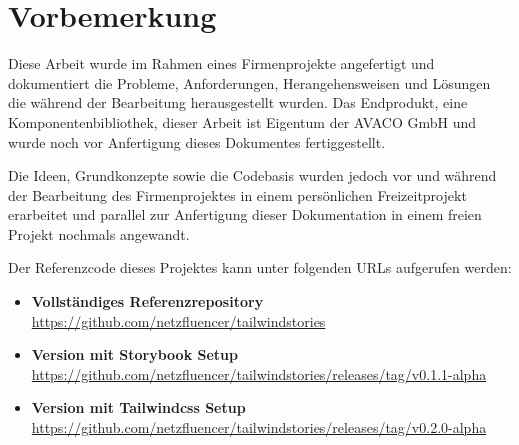 \chapter*{Vorbemerkung}
\label{sec:vorbemerkung}

Diese Arbeit wurde im Rahmen eines Firmenprojekte angefertigt und dokumentiert die Probleme, Anforderungen, Herangehensweisen und Lösungen die während der Bearbeitung herausgestellt wurden. Das Endprodukt, eine Komponentenbibliothek, dieser Arbeit ist Eigentum der AVACO GmbH und wurde noch vor Anfertigung dieses Dokumentes fertiggestellt.

Die Ideen, Grundkonzepte sowie die Codebasis wurden jedoch vor und während der Bearbeitung des Firmenprojektes in einem persönlichen Freizeitprojekt erarbeitet und parallel zur Anfertigung dieser Dokumentation in einem freien Projekt nochmals angewandt.

Der Referenzcode dieses Projektes kann unter folgenden URLs aufgerufen werden:
\begin{itemize}
  \item \textbf{Vollständiges Referenzrepository}\newline
  \url{https://github.com/netzfluencer/tailwindstories}

  \item \textbf{Version mit Storybook Setup}\newline
  \url{https://github.com/netzfluencer/tailwindstories/releases/tag/v0.1.1-alpha}

  \item \textbf{Version mit Tailwindcss Setup}\newline
  \url{https://github.com/netzfluencer/tailwindstories/releases/tag/v0.2.0-alpha}

\end{itemize}
